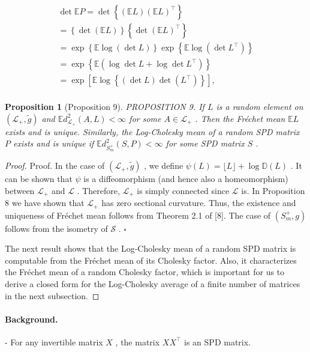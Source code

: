 \documentclass[11pt]{article}
\newtheorem{proposition}{Proposition}
\begin{document}
$$
\begin{array}{l} \det  \mathbb {E} P = \det  \left\{\left(\mathbb {E} L\right) \left(\mathbb {E} L\right) ^ {\top} \right\} \\ = \left\{\det  (\mathbb {E} L) \right\} \left\{\det  (\mathbb {E} L) ^ {\top} \right\} \\ = \exp \left\{\mathbb {E} \log (\det  L) \right\} \exp \left\{\mathbb {E} \log (\det  L ^ {\top}) \right\} \\ = \exp \left\{\mathbb {E} \left(\log \det  L + \log \det  L ^ {\top}\right) \right\} \\ = \exp \left[ \mathbb {E} \log \left\{\left(\det  L\right) \det  \left(L ^ {\top}\right) \right\} \right], \\ \end{array}
$$


\begin{proposition}[Proposition 9]
PROPOSITION 9. If  $L$  is a random element on  $(\mathcal{L}_{+},\tilde{g})$  and  $\mathbb{E}d_{\mathcal{L}_+}^2 (A,L) < \infty$  for some  $A\in \mathcal{L}_{+}$ . Then the Fréchet mean  $\mathbb{E}L$  exists and is unique. Similarly, the Log-Cholesky mean of a random SPD matrix  $P$  exists and is unique if  $\mathbb{E}d_{S_m^+}^2 (S,P) < \infty$  for some SPD matrix  $S$ .
\end{proposition}

\begin{proof}
Proof. In the case of  $(\mathcal{L}_{+},\tilde{g})$ , we define  $\psi (L) = \lfloor L\rfloor +\log \mathbb{D}(L)$ . It can be shown that  $\psi$  is a diffeomorphism (and hence also a homeomorphism) between  $\mathcal{L}_{+}$  and  $\mathcal{L}$ . Therefore,  $\mathcal{L}_{+}$  is simply connected since  $\mathcal{L}$  is. In Proposition 8 we have shown that  $\mathcal{L}_{+}$  has zero sectional curvature. Thus, the existence and uniqueness of Fréchet mean follows from Theorem 2.1 of [8]. The case of  $(S_m^+,g)$  follows from the isometry of  $\mathcal{S}$ .  $\square$

The next result shows that the Log-Cholesky mean of a random SPD matrix is computable from the Fréchet mean of its Cholesky factor. Also, it characterizes the Fréchet mean of a random Cholesky factor, which is important for us to derive a closed form for the Log-Cholesky average of a finite number of matrices in the next subsection.

\end{proof}

\paragraph{Background.}
- For any invertible matrix  $X$ , the matrix  $XX^{\top}$  is an SPD matrix.
\end{document}
